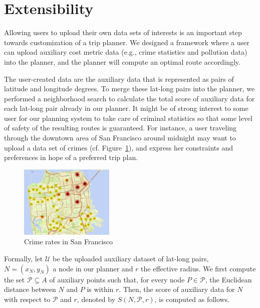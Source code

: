 \documentclass[letterpaper]{article}
\newcommand{\cU}{\mathcal{U}}
\newcommand{\cP}{\mathcal{P}}
\newcommand{\figref}[1]{Figure~\ref{fig:#1}}
\begin{document}
\section{Extensibility}
Allowing users to upload their own data sets of interests is an important
step towards customization of a trip planner.
We designed a framework where a user can upload auxiliary cost 
metric data (e.g., crime
statistics and pollution data) into the planner,
and the planner will compute an optimal route accordingly.

The user-created data are the auxiliary data that is represented as pairs
of latitude and longitude degrees.
To merge these lat-long pairs into the planner, we performed a neighborhood
search to calculate the total score of auxiliary data for each 
lat-long pair already in our planner.
It might be of strong interest to some user for our planning
system to take care of criminal statistics so that some level of safety
of the resulting routes is guaranteed.
For instance, a user traveling through the downtown area of San Francisco
around midnight may want to upload a data set of crimes (cf. \figref{sf_crime}), 
and express her constraints and preferences in hope of a preferred trip plan.

\begin{figure}[!ht]
  \centering
    \includegraphics[width=0.4\textwidth]{figs/sub_sf_crime_July2015.png}
  \caption{Crime rates in San Francisco\label{fig:sf_crime}}
\end{figure}

Formally, let $\cU$ be the uploaded auxiliary dataset of lat-long pairs, 
$N=(x_N,y_N)$ a node in our planner and $r$ the effective radius.
We first compute the set $\cP \subseteq A$ of auxiliary points such that,
for every node $P \in \cP$, the Euclidean distance between $N$ and $P$
is within $r$.
Then, the score of auxiliary data for $N$ with respect to $\cP$ and $r$,
denoted by $S(N,\cP,r)$, is computed as follows.
\end{document}
